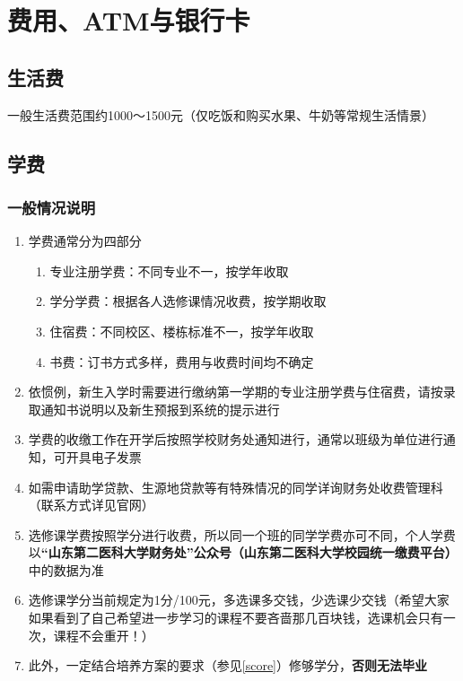 \section[费用、ATM与银行卡]{费用、ATM与银行卡}

\subsection[生活费]{生活费}
一般生活费范围约1000～1500元（仅吃饭和购买水果、牛奶等常规生活情景）

\subsection[学费]{学费\footnotemark}
\subsubsection[一般情况说明]{一般情况说明}
\begin{enumerate}
    \item 学费通常分为四部分\footnotemark
          \begin{enumerate}
              \item 专业注册学费：不同专业不一，按学年收取
              \item 学分学费：根据各人选修课情况收费，按学期收取
              \item 住宿费：不同校区、楼栋标准不一，按学年收取
              \item 书费：订书方式多样，费用与收费时间均不确定
          \end{enumerate}
    \item 依惯例，新生入学时需要进行缴纳第一学期的专业注册学费与住宿费，请按录取通知书说明以及新生预报到系统\footnotemark 的提示进行
    \item 学费的收缴工作在开学后按照学校财务处通知进行，通常以班级为单位进行通知，可开具电子发票
    \item 如需申请助学贷款、生源地贷款等有特殊情况的同学详询财务处收费管理科（联系方式详见官网）
    \item 选修课学费按照学分进行收费，所以同一个班的同学学费亦可不同，个人学费以\textbf{“山东第二医科大学财务处”公众号（山东第二医科大学校园统一缴费平台）}中的数据为准
    \item 选修课学分当前规定为1分/100元，多选课多交钱，少选课少交钱（希望大家如果看到了自己希望进一步学习的课程不要吝啬那几百块钱，选课机会只有一次，课程不会重开！）
    \item 此外，一定结合培养方案的要求（参见\uline{\ref{score}}）修够学分，\textbf{否则无法毕业}
\end{enumerate}

